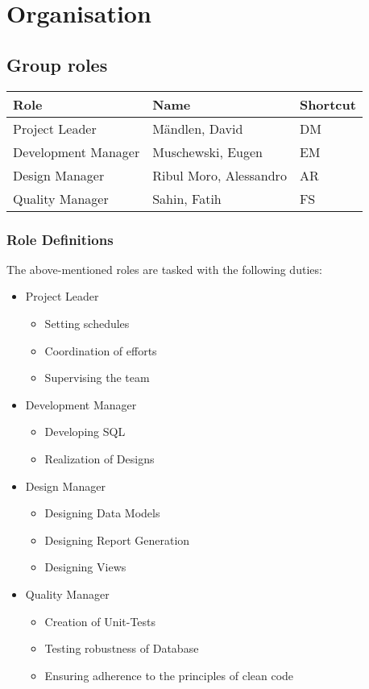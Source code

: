 \chapter{Organisation}
\section{Group roles}
\begin{table}[h]
	\begin{tabularx}{\textwidth}{XXX}
		Role & Name & Shortcut\\
		\toprule
		Project Leader & Mändlen, David & DM\\
		Development Manager & Muschewski, Eugen & EM\\
		Design Manager & Ribul Moro, Alessandro & AR\\
		Quality Manager & Sahin, Fatih & FS
	\end{tabularx}
\end{table}

\subsection{Role Definitions}
The above-mentioned roles are tasked with the following duties:
\begin{itemize}
	\item Project Leader
		\begin{itemize}
			\item Setting schedules
			\item Coordination of efforts
			\item Supervising the team
		\end{itemize}
	\item Development Manager
		\begin{itemize}
			\item Developing SQL
			\item Realization of Designs
		\end{itemize}
	\item Design Manager
		\begin{itemize}
			\item Designing Data Models
			\item Designing Report Generation
			\item Designing Views
		\end{itemize}
	\item Quality Manager
		\begin{itemize}
			\item Creation of Unit-Tests
			\item Testing robustness of Database
			\item Ensuring adherence to the principles of clean code
		\end{itemize}
\end{itemize}
